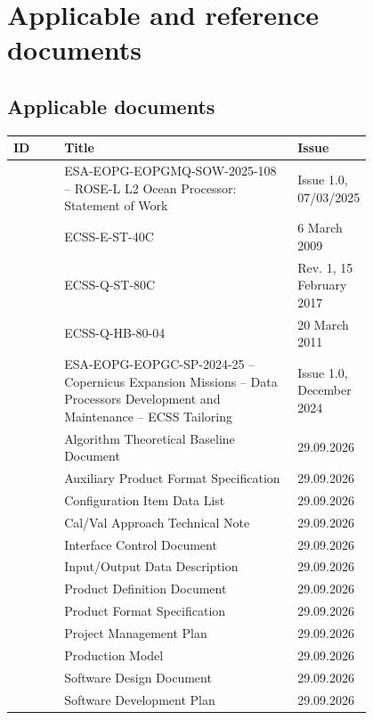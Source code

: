 \section{Applicable and reference documents}
\label{sec:sec2}

\subsection{Applicable documents}
\label{sec:app-doc}

\begin{xltabular}{\textwidth}{|l|p{0.65\linewidth}|p{0.15\linewidth}|}\hline
    ID & Title & Issue\\ \hline\hline
    [SoW] & ESA-EOPG-EOPGMQ-SOW-2025-108 -- ROSE-L L2 Ocean Processor: Statement of Work & Issue 1.0, 07/03/2025 \\ \hline
    [ECSS-E] & ECSS-E-ST-40C & 6 March 2009 \\ \hline
    [ECSS-Q] & ECSS-Q-ST-80C & Rev. 1, 15 February 2017 \\ \hline
    [ECSS-H] & ECSS-Q-HB-80-04 & 20 March 2011 \\ \hline
    [ECSS-T] & ESA-EOPG-EOPGC-SP-2024-25 -- Copernicus Expansion Missions -- Data Processors
Development and Maintenance -- ECSS Tailoring & Issue 1.0, December 2024 \\ \hline
    [ATBD] & Algorithm Theoretical Baseline Document & 29.09.2026 \\  & Auxiliary Product Format Specification & 29.09.2026 \\ \hline
    [CIDL] & Configuration Item Data List & 29.09.2026 \\ \hline
    [CVA-TN] & Cal/Val Approach Technical Note & 29.09.2026 \\ \hline
    [ICD] & Interface Control Document & 29.09.2026 \\ \hline
    [IODD] & Input/Output Data Description & 29.09.2026 \\ \hline
    [PDD] & Product Definition Document & 29.09.2026 \\ \hline
    [PFS] & Product Format Specification & 29.09.2026 \\ \hline
    [PMP] & Project Management Plan & 29.09.2026 \\ \hline
    [PRODMOD] & Production Model & 29.09.2026 \\ \hline
    [SDD] & Software Design Document & 29.09.2026 \\ \hline
    [SDP] & Software Development Plan & 29.09.2026 \\ \hline

\end{xltabular}
